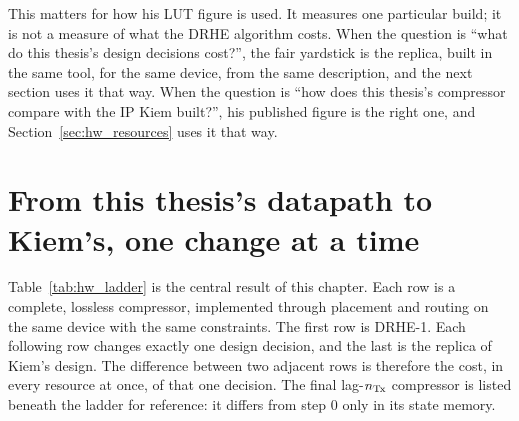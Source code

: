 This matters for how his LUT figure is used. It measures one particular build;
it is not a measure of what the DRHE algorithm costs. When the question is
``what do this thesis's design decisions cost?'', the fair yardstick is the
replica, built in the same tool, for the same device, from the same
description, and the next section uses it that way. When the question is ``how
does this thesis's compressor compare with the IP Kiem built?'', his published
figure is the right one, and Section~\ref{sec:hw_resources} uses it that way.

\section{From this thesis's datapath to Kiem's, one change at a time}
\label{sec:hw_ladder}

Table~\ref{tab:hw_ladder} is the central result of this chapter. Each row is a
complete, lossless compressor, implemented through placement and routing on the
same device with the same constraints. The first row is DRHE-1. Each following
row changes exactly one design decision, and the last is the replica of Kiem's
design. The difference between two adjacent rows is therefore the cost, in
every resource at once, of that one decision. The final lag-$n_{\mathrm{Tx}}$ compressor
is listed beneath the ladder for reference: it differs from step 0 only in its
state memory.

